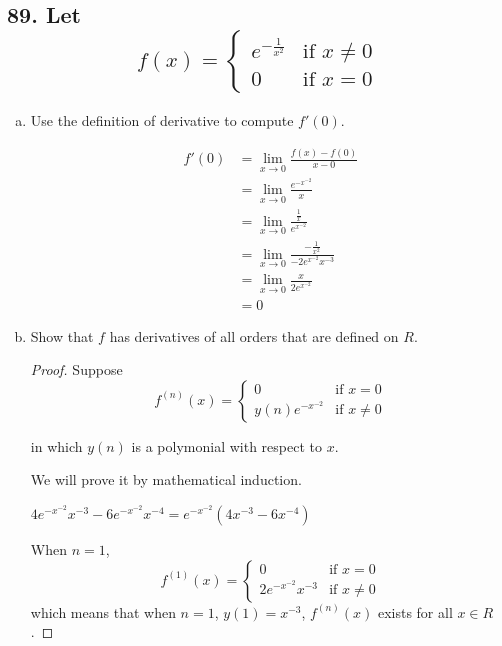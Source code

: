 \documentclass{article}
\begin{document}
    \subsection*{89. Let $$f(x) = \left\{ \begin{array}{ll}
        e^{-\frac{1}{x^2}} & \textrm{if $x \not = 0$} \\
        0 & \textrm{if $x = 0$} \end{array} \right . $$}
    \begin{enumerate}[(a)]
        \item Use the definition of derivative to compute $f'(0)$.

        $$\begin{aligned}
            f'(0) &= \lim_{x \to 0}\frac{f(x) - f(0)}{x - 0} \\
            &= \lim_{x \to 0}\frac{e^{-x^{-2}}}{x} \\
            &= \lim_{x \to 0}\frac{\frac{1}{x}}{e^{x^{-2}}} \\
            &= \lim_{x \to 0}\frac{-\frac{1}{x^2}}{-2e^{x^{-2}}x^{-3}} \\
            &= \lim_{x \to 0}\frac{x}{2e^{x^{-2}}} \\
            &= 0
        \end{aligned}$$

        \item Show that $f$ has derivatives of all orders that are defined on $R$.

        \begin{proof}
            Suppose $$f^{(n)}(x) = \left\{ \begin{array}{ll}
                0 & \textrm{if $x = 0$} \\
                y(n)e^{-x^{-2}} & \textrm{if $x \not = 0$}
            \end{array} \right.$$

            in which $y(n)$ is a polymonial with respect to $x$.

            We will prove it by mathematical induction.

            $4e^{-x^{-2}}x^{-3} - 6e^{-x^{-2}}x^{-4} = e^{-x^{-2}}(4x^{-3} - 6x^{-4})$

            When $n = 1$, $$f^{(1)}(x) = \left\{ \begin{array}{ll}
                0 & \textrm{if $x = 0$} \\
                2e^{-x^{-2}}x^{-3} & \textrm{if $x \not = 0$}
            \end{array} \right.$$ which means that when $n = 1$, $y(1) = x^{-3}$, $f^{(n)}(x)$ exists for all $x \in R$.


\end{proof}
\end{enumerate}
\end{document}
